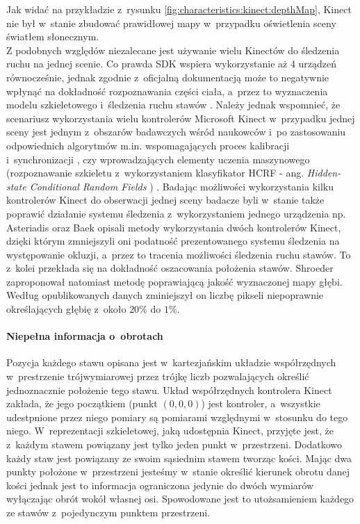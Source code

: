 																																			
Jak widać na przykładzie z~rysunku \ref{fig:characteristics:kinect:depthMap}, Kinect nie był w~stanie zbudować prawidłowej mapy w~przypadku oświetlenia sceny światłem słonecznym. \\
Z podobnych względów niezalecane jest używanie wielu Kinectów do śledzenia ruchu na jednej scenie. Co prawda SDK wspiera wykorzystanie aż 4 urządzeń równocześnie, jednak zgodnie z~oficjalną dokumentacją może to negatywnie wpłynąć na dokładność rozpoznawania części ciała, a~przez to wyznaczenia modelu szkieletowego i~śledzenia ruchu stawów . Należy jednak wspomnieć, że scenariusz wykorzystania wielu kontrolerów Microsoft Kinect w~przypadku jednej sceny jest jednym z~obszarów badawczych wśród naukowców i~po zastosowaniu odpowiednich algorytmów m.in.  wspomagających proces kalibracji i~synchronizacji \cite{Kohno2013}, czy wprowadzających elementy uczenia maszynowego (rozpoznawanie szkieletu z~wykorzystaniem klasyfikator HCRF - ang. \emph{Hidden-state Conditional Random Fields }) \cite{Kitsikidis2011}. Badając możliwości wykorzystania kilku kontrolerów Kinect do obserwacji jednej sceny badacze byli w~stanie także poprawić działanie systemu śledzenia z~wykorzystaniem jednego urządzenia np. Asteriadis \cite{Asteriadis2013} oraz Baek \cite{Baek2014} opisali metody wykorzystania dwóch kontrolerów Kinect, dzięki którym zmniejszyli oni podatność prezentowanego systemu śledzenia na występowanie okluzji, a~przez to tracenia możliwości śledzenia ruchu stawów. To z~kolei przekłada się na dokładność oszacowania położenia stawów. Shroeder \cite{Schroder2011} zaproponował natomiast metodę poprawiającą jakość wyznaczonej mapy głębi. Według opublikowanych danych zminiejszył on liczbę pikseli niepoprawnie określających głębię z~około $20\%$ do $1\%$.
																																			
\paragraph*{Niepełna informacja o~obrotach}
Pozycja każdego stawu opisana jest w~kartezjańskim układzie współrzędnych w~prestrzenie trójwymiarowej przez trójkę liczb pozwalających określić jednoznacznie położenie tego stawu. Układ współrzędnych kontrolera Kinect zakłada, że jego początkiem (punkt $(0, 0, 0)$) jest kontroler, a~wszystkie udestpnione przez niego pomiary są pomiarami względnymi w~stosunku do tego niego. W~reprezentacji szkieletowej, jaką udostępnia Kinect, przyjęte jest, że z~każdym stawem powiązany jest tylko jeden punkt w~przestrzeni. Dodatkowo każdy staw jest powiązany ze swoim sąsiednim stawem tworząc kości. Mając dwa punkty położone w~przestrzeni jesteśmy w~stanie określić kierunek obrotu danej kości jednak jest to informacja ograniczona jedynie do dwóch wymiarów wyłączając obrót wokół własnej osi. Spowodowane jest to utożsamieniem każdego ze stawów z~pojedynczym punktem przestrzeni.
																																			
